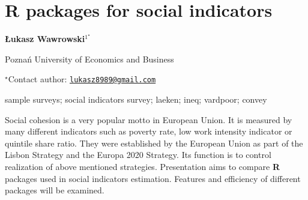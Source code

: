 \documentclass[\main/boa.tex]{subfiles}
\begin{document}
\pagestyle{empty}

\section{R packages for social indicators}

\begin{center}
  {\bf Łukasz Wawrowski$^{1^\star}$}
\end{center}

\vskip 0.3cm

\begin{affiliations}
\begin{enumerate}
\begin{minipage}{0.915\textwidth}
\centering
\item Poznań University of Economics and Business \\[-2pt]
\end{minipage}
\end{enumerate}
$^\star$Contact author: \href{mailto:lukasz8989@gmail.com}{\nolinkurl{lukasz8989@gmail.com}}\\
\end{affiliations}

\vskip 0.5cm

\begin{minipage}{0.915\textwidth}
\keywords sample surveys; social indicators
\packages survey; laeken; ineq; vardpoor; convey
\end{minipage}

\vskip 0.8cm

Social cohesion is a very popular motto in European Union. It is
measured by many different indicators such as poverty rate, low work
intensity indicator or quintile share ratio. They were established by
the European Union as part of the Lisbon Strategy and the Europa 2020
Strategy. Its function is to control realization of above mentioned
strategies. Presentation aims to compare \textbf{R} packages used in
social indicators estimation. Features and efficiency of different
packages will be examined.
\end{document}
